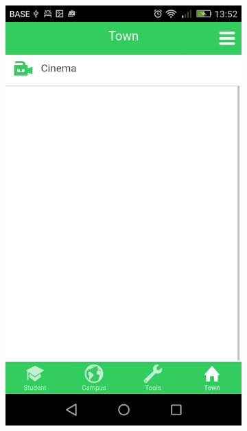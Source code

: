 \documentclass{eplmastersthesis}
\begin{document}
\begin{figure}
\begin{subfigure}[b]{0.3\textwidth}
        \includegraphics[width=\textwidth]{Images/Application_screens/Screenshot_2016-06-06-13-52-44.png}
    \end{subfigure}
\end{figure}
\end{document}
